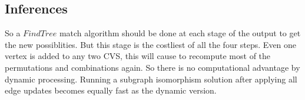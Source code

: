 \subsection{Inferences}
	\hspace{10mm} So a $Find Tree$ match algorithm should be done at each stage of the output to get the new possiblities. But this stage is the costliest of all the four steps. Even one vertex is added to any two CVS, this will cause to recompute most of the permutations and combinations again. So there is no computational advantage by dynamic processing. Running a subgraph isomorphism solution after applying all edge updates becomes equally fast as the dynamic version. 
